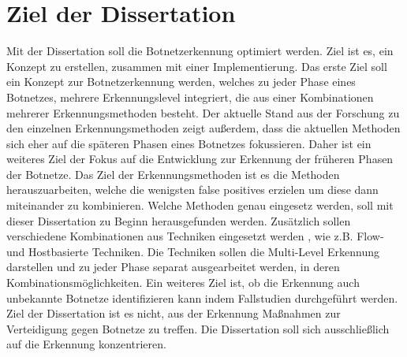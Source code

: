 \section{Ziel der Dissertation}
\label{sec:goals}

Mit der Dissertation soll die Botnetzerkennung optimiert werden. Ziel ist es, ein Konzept zu erstellen, zusammen mit einer Implementierung.
Das erste Ziel soll ein Konzept zur Botnetzerkennung werden, welches zu jeder Phase eines Botnetzes, mehrere Erkennungslevel integriert, die aus einer Kombinationen 
mehrerer Erkennungsmethoden besteht. Der aktuelle Stand aus der Forschung zu den einzelnen Erkennungsmethoden zeigt außerdem, dass die aktuellen Methoden sich eher 
auf die späteren Phasen eines Botnetzes fokussieren. Daher ist ein weiteres Ziel der Fokus auf die Entwicklung zur Erkennung der früheren Phasen der Botnetze.
Das Ziel der Erkennungsmethoden ist es die Methoden herauszuarbeiten, welche die wenigsten false positives erzielen um diese dann miteinander zu kombinieren. Welche 
Methoden genau eingesetz werden, soll mit dieser Dissertation zu Beginn herausgefunden werden. Zusätzlich sollen verschiedene Kombinationen aus Techniken eingesetzt werden
, wie z.B. Flow- und Hostbasierte Techniken. Die Techniken sollen die Multi-Level Erkennung darstellen und zu jeder Phase separat ausgearbeitet werden, in deren Kombinationsmöglichkeiten.
Ein weiteres Ziel ist, ob die Erkennung auch unbekannte Botnetze identifizieren kann indem Fallstudien durchgeführt werden. \\ Ziel der Dissertation ist es nicht, aus der 
Erkennung Maßnahmen zur Verteidigung gegen Botnetze zu treffen. Die Dissertation soll sich ausschließlich auf die Erkennung konzentrieren. 